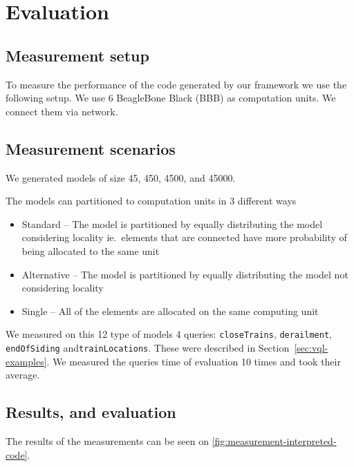 
\chapter{Evaluation}


\section{Measurement setup}

To measure the performance of the code generated by our framework we use the following setup.
We use 6 BeagleBone Black (BBB) \cite{BBB} as computation units. 
We connect them via network. 


\section{Measurement scenarios}

We generated models of size 45, 450, 4500, and 45000.

The models can partitioned to computation units in 3 different ways 
\begin{itemize}
	\item Standard -- The model is partitioned by equally distributing the model considering locality ie.\ elements that are connected have more probability of being allocated to the same unit
	\item Alternative -- The model is partitioned by equally distributing the model not considering locality
	\item Single -- All of the elements are allocated on the same computing unit
\end{itemize}

We measured on this 12 type of models 4 queries: \texttt{closeTrains}, \texttt{derailment}, \texttt{endOfSiding} and\texttt{trainLocations}. 
These were described in Section~\ref{sec:vql-examples}.
We measured the queries time of evaluation 10 times and took their average.

\pagebreak

\section{Results, and evaluation}

The results of the measurements can be seen on \autoref{fig:measurement-interpreted-code}.

